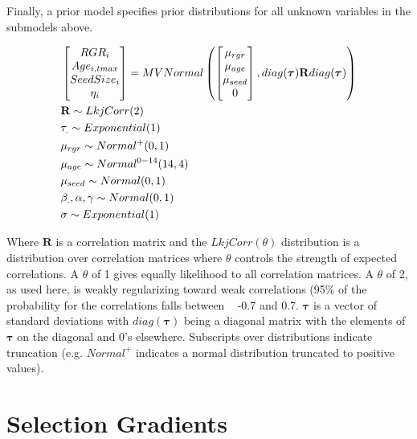 \documentclass{article}
\begin{document}
Finally, a prior model specifies prior distributions for all unknown variables in the submodels above.

\begin{align*}
&\begin{bmatrix}
RGR_i \\
Age_{i,tmax} \\
SeedSize_i \\
\eta_i
\end{bmatrix} = MVNormal \left( \begin{bmatrix}
\mu_{rgr} \\
\mu_{age} \\
\mu_{seed} \\
0
\end{bmatrix}, \space diag(\bm{\tau})\space  \mathbf{R}\space diag(\bm{\tau}) \right) \\
&\mathbf{R} \sim LkjCorr(2) \\
&\tau_. \sim Exponential(1) \\
&\mu_{rgr} \sim Normal^+(0, 1) \\
&\mu_{age} \sim Normal^{0-14}(14, 4) \\
&\mu_{seed} \sim Normal(0, 1) \\
&\beta_., \alpha, \gamma \sim Normal(0, 1) \\
&\sigma \sim Exponential(1)
\end{align*}

Where \(\mathbf{R}\) is a correlation matrix and the \(LkjCorr(\theta)\) distribution is a distribution over correlation matrices where \(\theta\) controls the strength of expected correlations. A \(\theta\) of 1 gives equally likelihood to all correlation matrices. A \(\theta\) of 2, as used here, is weakly regularizing toward weak correlations (95\% of the probability for the correlations falls between ~ -0.7 and 0.7. \(\bm{\tau}\) is a vector of standard deviations with \(diag(\bm{\tau})\) being a diagonal matrix with the elements of \(\bm{\tau}\) on the diagonal and 0's elsewhere. Subscripts over distributions indicate truncation (e.g. \(Normal^+\) indicates a normal distribution truncated to positive values). 

\section{Selection Gradients}
\end{document}
